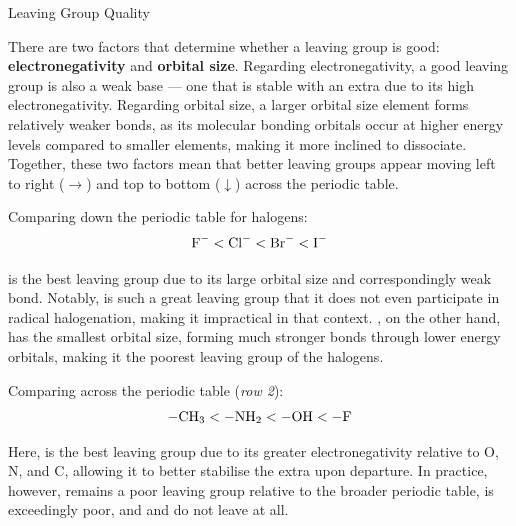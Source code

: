 \documentclass[10pt]{article}
\begin{document}
  \begin{core}{Leaving Group Quality}

    There are two factors that determine whether a leaving group is good: \textbf{electronegativity} and \textbf{orbital size}. Regarding electronegativity, a good leaving group is also a weak base  --- one that is stable with an extra  due to its high electronegativity. Regarding orbital size, a larger orbital size element forms relatively weaker bonds, as its molecular bonding orbitals occur at higher energy levels compared to smaller elements, making it more inclined to dissociate. Together, these two factors mean that better leaving groups appear moving left to right ($\rightarrow$) and top to bottom ($\downarrow$) across the periodic table.


    Comparing down the periodic table for halogens:
    \[
      \ce{F-} < \ce{Cl-} < \ce{Br-} < \ce{I-}
    \]

     is the best leaving group due to its large orbital size and correspondingly weak bond. Notably,  is such a great leaving group that it does not even participate in radical halogenation, making it impractical in that context. , on the other hand, has the smallest orbital size, forming much stronger bonds through lower energy orbitals, making it the poorest leaving group of the halogens.

    Comparing across the periodic table (\textit{row 2}):
    \[
      \ce{-CH3} < \ce{-NH2} < \ce{-OH} < \ce{-F}
    \]

    Here,  is the best leaving group due to its greater electronegativity relative to O, N, and C, allowing it to better stabilise the extra  upon departure. In practice, however,  remains a poor leaving group relative to the broader periodic table,  is exceedingly poor, and  and  do not leave at all.


\end{core}
\end{document}
